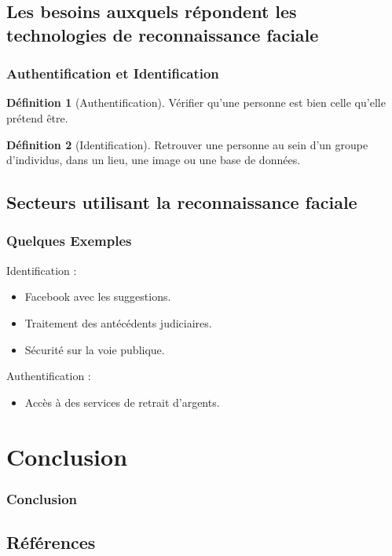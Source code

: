 \documentclass{beamer}
\theoremstyle{plain}
\theoremstyle{definition}
\newtheorem{defi}{Définition}
\begin{document}
\subsection{Les besoins auxquels répondent les technologies de reconnaissance faciale}
\begin{frame}
  \frametitle{Authentification et Identification}
  \begin{defi}[Authentification]
    Vérifier qu’une personne est bien celle qu’elle prétend être.
  \end{defi}
  
  \pause

  \begin{defi}[Identification]
    Retrouver une personne au sein d’un groupe d’individus, dans un lieu, une image ou une base de données.
  \end{defi}
\end{frame}



\subsection{Secteurs utilisant la reconnaissance faciale}
\begin{frame}
  \frametitle{Quelques Exemples}
  Identification :
  \begin{itemize}
  \item <2-> Facebook avec les suggestions.
  \item <4-> Traitement des antécédents judiciaires.
  \item <5-> Sécurité sur la voie publique.
  \end{itemize}

  Authentification :
  \begin{itemize}
  \item <3-> Accès à des services de retrait d'argents.
  \end{itemize}  
\end{frame}



\section{Conclusion}
\begin{frame}
  \frametitle{Conclusion}
\end{frame}



\subsection{Références}
\begin{frame}  
\end{frame}
\end{document}
